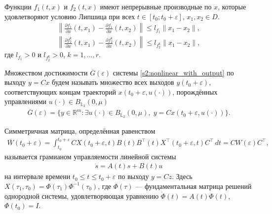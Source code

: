 \documentclass[../abstract.tex]{subfiles}
\begin{document}
\begin{assumption}\label{s1:as:right_hand_side_diff_lip}
	Функции $f_1(t,x)$ и $f_2(t,x)$ имеют непрерывные производные по $x$, которые удовлетворяют условию Липшица при всех $t \in [t_0;t_0 + \varepsilon]$, $x_1, x_2 \in D$.
	\begin{gather*}
		\left\| \frac{\partial f_1}{\partial x}(t,x_1) - \frac{\partial f_1}{\partial x}(t,x_2) \right\| \leqslant l_{f_1} \| x_1 - x_2\|, \\
		\left\| \frac{\partial f_2^k}{\partial x}(t,x_1) - \frac{\partial f_2^k}{\partial x}(t,x_2) \right\| \leqslant l_{f_2^k} \| x_1 - x_2\|,
	\end{gather*}
	где $l_{f_1} > 0$ и $l_{f_2^k} > 0$, $k = 1,...,r$.
\end{assumption}

\begin{definition}
	{\textit Множеством достижимости $\overline{G}(\varepsilon)$ системы \eqref{s2:nonlinear_with_output} по выходу} $ y = C x $ будем называть множество всех выходов $ y(t_0+\varepsilon) $,
	соответствующих концам траекторий $ x(t_0+\varepsilon, u(\cdot)) $, порождённых управлениями $ u(\cdot) \in B_{\mathbb{L}_2}(0,\mu)$
	\begin{gather*}
		\overline{G}(\varepsilon)=\{y\in \mathbb{R}^m:\exists u(\cdot)\in B_{\mathbb{L}_2}(0,\mu),\; y=Cx(t_0+\varepsilon, u(\cdot))\}.
	\end{gather*}
\end{definition}

\begin{definition}
	Симметричная матрица, определённая равенством
	\begin{gather*}
		\overline{W}(t_0 + \varepsilon) = \int_{t_0}^{t_0+\varepsilon} C X(t_0+\varepsilon,t)B(t)B^{\top}(t)X^{\top}(t_0+\varepsilon,t) C^\top \, dt=CW(\varepsilon)C^\top,
	\end{gather*}
	называется грамианом управляемости линейной системы 
	\begin{gather}\label{s2:linear_system}
		\dot{s} = A(t) s + B(t) u
	\end{gather}
	на интервале времени $ t_0 \leqslant t \leqslant t_0 + \varepsilon $ по выходу $y = C z$. 
	Здесь $X(\tau_1, \tau_0) = \Phi(\tau_1) \Phi^{−1}(\tau_0)$, где $\Phi(\tau)$ ---
	фундаментальная матрица решений однородной системы, удовлетворяющая уравнению
	$\dot{\Phi}(t) = A(t) \Phi(t)$, $\Phi(t_0) = I$.
\end{definition}
\end{document}
